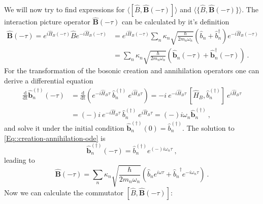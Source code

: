 	We will now try to find expressions for $\langle [\hat{B}, \boldsymbol{\hat{B}}(-\tau) ]  \rangle$ and $\langle  \{\hat{B}, \boldsymbol{\hat{B}}(-\tau) \}  \rangle$. The interaction picture operator $\boldsymbol{\hat{B}}(-\tau)$ can be calculated by it's definition
	\begin{equation}
		\begin{split}
			\boldsymbol{\hat{B}}(-\tau) =	e^{i \hat{H}_B (-\tau)} \hat{B} e^{- i \hat{H}_B (-\tau)} &=	 e^{i \hat{H}_B (-\tau)} \sum_n \kappa_n \sqrt{\frac{\hbar}{2 m_n \omega_n}} \left(\hat{b}_n + \hat{b}_n^\dagger\right) e^{- i \hat{H}_B (-\tau)} \\
			&=	\sum_n \kappa_n \sqrt{\frac{\hbar}{2 m_n \omega_n}} \left(\boldsymbol{\hat{b}}_n(-\tau) + \boldsymbol{\hat{b}}_n^\dagger(-\tau) \right)~.		
		\end{split}	
	\end{equation}
	For the transformation of the bosonic creation and annihilation operators one can derive a differential equation
	\begin{equation} \label{Eq::creation-annihilation-ode}
		\begin{split}
			\frac{\text{d}}{\text{dt}} \boldsymbol{\hat{b}}^{(\dagger)}_n(-\tau) &=	\frac{\text{d}}{\text{dt}} \left(e^{- i \hat{H}_B \tau}~ \hat{b}_n^{(\dagger)}~e^{ i \hat{H}_B \tau}\right) = -i~e^{- i \hat{H}_B \tau}~ \left[\hat{H}_B, \hat{b}_n^{(\dagger)}\right]~e^{i \hat{H}_B \tau} \\
			&=	(-)i~e^{- i \hat{H}_B \tau}~ \hat{b}_n^{(\dagger)}~e^{i \hat{H}_B \tau}  =	(-)i\omega_n \boldsymbol{\hat{b}}_n^{(\dagger)}~,
		\end{split}		
	\end{equation}
	and solve it under the initial condition $\boldsymbol{\hat{b}}_n^{(\dagger)}(0) = \hat{b}_n^{(\dagger)}	$. The solution to \autoref{Eq::creation-annihilation-ode} is
	\begin{equation}
		\boldsymbol{\hat{b}}_n^{(\dagger)}(-\tau) = \hat{b}_n^{(\dagger)} e^{(-)i\omega_n \tau}~,
	\end{equation}
	leading to 
	\begin{equation}
		\boldsymbol{\hat{B}}(-\tau) =	\sum_n \kappa_n \sqrt{\frac{\hbar}{2 m_n \omega_n}} \left({\hat{b}_n}e^{i \omega \tau} + {\hat{b}_n}^\dagger e^{-i \omega_n \tau} \right)~.
	\end{equation}
	Now we can calculate the commutator $[\hat{B}, \boldsymbol{\hat{B}}(-\tau) ]$:
